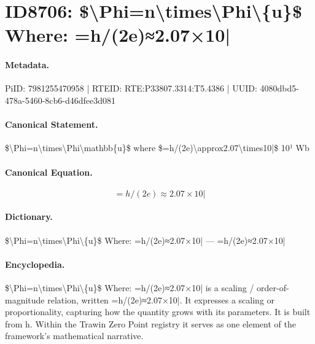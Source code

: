 \section*{ID8706: \$\textbackslash{}Phi=n\textbackslash{}times\textbackslash{}Phi\textbackslash{}\{u\}\$ Where: =h/(2e)≈2.07×10|}
\paragraph{Metadata.}
PiID: 7981255470958 | RTEID: RTE:P33807.3314:T5.4386 | UUID: 4080dbd5-478a-5460-8cb6-d46dfee3d081

\paragraph{Canonical Statement.}
\$\textbackslash{}Phi=n\textbackslash{}times\textbackslash{}Phi\textbackslash{}mathbb\{u\}\$ where \$=h/(2e)\textbackslash{}approx2.07\textbackslash{}times10|\$ 10¹ Wb

\paragraph{Canonical Equation.}
\[
=h/(2e)\approx2.07\times10|
\]

\paragraph{Dictionary.}
\$\textbackslash{}Phi=n\textbackslash{}times\textbackslash{}Phi\textbackslash{}\{u\}\$ Where: =h/(2e)≈2.07×10| — =h/(2e)≈2.07×10|

\paragraph{Encyclopedia.}
\$\textbackslash{}Phi=n\textbackslash{}times\textbackslash{}Phi\textbackslash{}\{u\}\$ Where: =h/(2e)≈2.07×10| is a scaling / order-of-magnitude relation, written =h/(2e)≈2.07×10|. It expresses a scaling or proportionality, capturing how the quantity grows with its parameters. It is built from h. Within the Trawin Zero Point registry it serves as one element of the framework's mathematical narrative.

